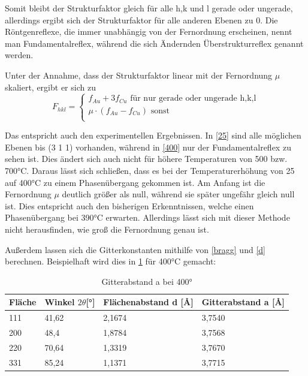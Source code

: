 \documentclass[
	a4paper,
	12pt,
	pagesize,
	ngerman
]{scrartcl}
\begin{document}
Somit bleibt der Strukturfaktor gleich für alle h,k und l gerade oder ungerade, allerdings ergibt sich der Strukturfaktor für alle anderen Ebenen zu 0. 
Die Röntgenreflexe, die immer unabhängig von der Fernordnung erscheinen, nennt man Fundamentalreflex, während die sich Ändernden Überstrukturreflex genannt werden.

Unter der Annahme, dass der Strukturfaktor linear mit der Fernordnung $\mu$ skaliert, ergibt er sich zu
\begin{equation}
F_{hkl} = \left \{ \begin{array}{ll}
f_{Au} + 3f_{Cu} \text{  für nur gerade oder ungerade h,k,l} \\
\mu \cdot (f_{Au} - f_{Cu}) \text{  sonst} \\
\end{array} \right.
\end{equation}

Das entspricht auch den experimentellen Ergebnissen. In \cref{25} sind alle möglichen Ebenen bis (3 1 1) vorhanden, während in \cref{400} nur der Fundamentalreflex zu sehen ist. Dies ändert sich auch nicht für höhere Temperaturen von 500 bzw. 700°C. 
Daraus lässt sich schließen, dass es bei der Temperaturerhöhung von 25 auf 400°C zu einem Phasenübergang gekommen ist. Am Anfang ist die Fernordnung $\mu$ deutlich größer als null, während sie später ungefähr gleich null ist. Dies entspricht auch den bisherigen Erkenntnissen, welche einen Phasenübergang bei 390°C erwarten. Allerdings lässt sich mit dieser Methode nicht herausfinden, wie groß die Fernordnung genau ist. 

Außerdem lassen sich die Gitterkonstanten mithilfe von \cref{bragg} und \cref{d} berechnen. Beispielhaft wird dies in \cref{tab} für 400°C gemacht:
\begin{table}[h]
\caption{Gitterabstand a bei 400°}
\begin{tabular}{|l|l|l|l|}
\hline
Fläche & Winkel $2 \theta${[}°{]} & Flächenabstand d {[}\AA{]} & Gitterabstand a {[}\AA{]} \\ \hline
111    & 41,62                     & 2,1674        & 3,7540      \\ \hline
200    & 48,4                      & 1,8784        & 3,7568       \\ \hline
220    & 70,64                     & 1,3319        & 3,7670       \\ \hline
331    & 85,24                     & 1,1371         & 3,7715       \\ \hline
\end{tabular}
\label{tab}
\end{table} 
\end{document}
